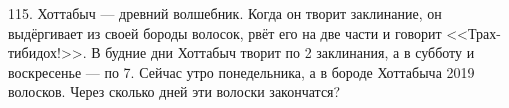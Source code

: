 115. Хоттабыч --- древний волшебник. Когда он творит заклинание, он выдёргивает из своей бороды волосок, рвёт его на две части и говорит <<Трах-тибидох!>>. В будние дни Хоттабыч творит по 2 заклинания, а в субботу и воскресенье --- по 7. Сейчас утро понедельника, а в бороде Хоттабыча 2019
волосков. Через сколько дней эти волоски закончатся?\\
